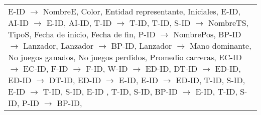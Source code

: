 \documentclass{report}
\begin{document}
\begin{tabularx}{\textwidth}{|X|}
        \hspace*{0.9cm} E-ID $\rightarrow$ NombreE, Color, Entidad representante, Iniciales, \newline
        \hspace*{0.9cm} E-ID, AI-ID $\rightarrow$ E-ID, AI-ID, \newline
        \hspace*{0.9cm} T-ID $\rightarrow$ T-ID, \newline
        \hspace*{0.9cm} T-ID, S-ID $\rightarrow$ NombreTS, TipoS, Fecha de inicio, Fecha de fin, \newline
        \hspace*{0.9cm} P-ID $\rightarrow$ NombrePos, \newline
        \hspace*{0.9cm} BP-ID $\rightarrow$ Lanzador, \newline
        \hspace*{0.9cm} Lanzador $\rightarrow$ BP-ID, \newline
        \hspace*{0.9cm} Lanzador $\rightarrow$ Mano dominante, No juegos ganados, No juegos perdidos, Promedio carreras, \newline
        \hspace*{0.9cm} EC-ID $\rightarrow$ EC-ID, \newline
        \hspace*{0.9cm} F-ID $\rightarrow$ F-ID, \newline
        \hspace*{0.9cm} W-ID $\rightarrow$ ED-ID,  \newline
        \hspace*{0.9cm} DT-ID $\rightarrow$ ED-ID, \newline
        \hspace*{0.9cm} ED-ID $\rightarrow$ DT-ID, \newline
        \hspace*{0.9cm} ED-ID $\rightarrow$ E-ID,  \newline
        \hspace*{0.9cm} E-ID $\rightarrow$ ED-ID, \newline
        \hspace*{0.9cm} T-ID, S-ID, E-ID $\rightarrow$ T-ID, S-ID, E-ID , \newline
        \hspace*{0.9cm} T-ID, S-ID, BP-ID $\rightarrow$ E-ID, \newline
        \hspace*{0.9cm} T-ID, S-ID, P-ID $\rightarrow$ BP-ID, \newline

\end{tabularx}
\end{document}
